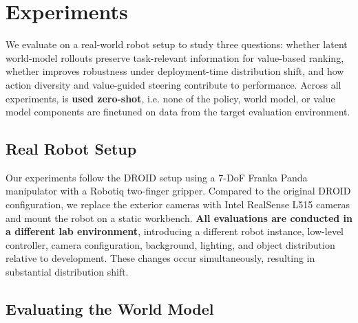 \section{Experiments}

We evaluate \coolname{} on a real-world robot setup to study three questions: whether latent world-model rollouts preserve task-relevant information for value-based ranking, whether \coolname{} improves robustness under deployment-time distribution shift, and how action diversity and value-guided steering contribute to performance. Across all experiments, \coolname{} is \textbf{used zero-shot}, i.e. none of the policy, world model, or value model components are finetuned on data from the target evaluation environment.

\subsection{Real Robot Setup}

Our experiments follow the DROID setup using a 7-DoF Franka Panda manipulator with a Robotiq two-finger gripper. Compared to the original DROID configuration, we replace the exterior cameras with Intel RealSense L515 cameras and mount the robot on a static workbench.
\textbf{All evaluations are conducted in a different lab environment}, introducing a different robot instance, low-level controller, camera configuration, background, lighting, and object distribution relative to \coolname{} development. These changes occur simultaneously, resulting in substantial distribution shift.







\subsection{Evaluating the World Model}

